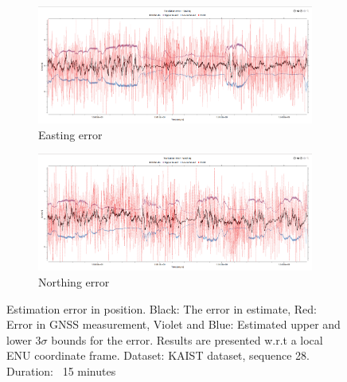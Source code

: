 \begin{figure}[htp]
	\centering
    \begin{subfigure}{\textwidth}
        \includegraphics[width=\textwidth]{figs/easting_error.png}
        \caption{Easting error}
    \end{subfigure}
    \begin{subfigure}{\textwidth}
        \includegraphics[width=\textwidth]{figs/northing_error.png}
        \caption{Northing error}
    \end{subfigure}
    \vspace{-0.5cm}
    \caption[Estimation error in position]{Estimation error in position. Black: The error in estimate, Red: Error in GNSS measurement, Violet and Blue: Estimated upper and lower 3$\sigma$ bounds for the error. Results are presented w.r.t a local ENU coordinate frame. Dataset: KAIST dataset, sequence 28. Duration: ~15 minutes}
    \label{fig:pa:estimationError}
    \vspace{0.5cm}
\end{figure}

